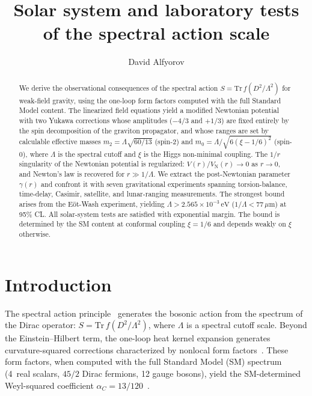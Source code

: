 \documentclass[aps,prd,twocolumn,superscriptaddress,nofootinbib,floatfix]{revtex4-2}
\begin{document}
\title{Solar system and laboratory tests of the spectral action scale}

\author{David Alfyorov}

\begin{abstract}
We derive the observational consequences of the spectral action
$S = \mathrm{Tr}\,f(D^2/\Lambda^2)$ for weak-field gravity, using the
one-loop form factors computed with the full Standard Model content.
The linearized field equations yield a modified Newtonian potential with
two Yukawa corrections whose amplitudes ($-4/3$ and $+1/3$) are
fixed entirely by the spin decomposition of the graviton
propagator, and whose ranges are set by calculable effective masses
$m_2 = \Lambda\sqrt{60/13}$ (spin-2) and
$m_0 = \Lambda/\sqrt{6(\xi-1/6)^2}$ (spin-0), where $\Lambda$ is the
spectral cutoff and $\xi$ is the Higgs non-minimal coupling.
The $1/r$ singularity of the Newtonian potential is regularized:
$V(r)/V_\mathrm{N}(r) \to 0$ as $r \to 0$, and Newton's law is
recovered for $r \gg 1/\Lambda$.
We extract the post-Newtonian parameter $\gamma(r)$ and confront it with
seven gravitational experiments spanning torsion-balance, time-delay,
Casimir, satellite, and lunar-ranging measurements.
The strongest bound arises from the E\"ot-Wash experiment, yielding
$\Lambda > 2.565 \times 10^{-3}\,\mathrm{eV}$ ($1/\Lambda < 77\,\mu\mathrm{m}$)
at 95\% CL.
All solar-system tests are satisfied with exponential margin.
The bound is determined by the SM content at conformal coupling $\xi = 1/6$ and depends
weakly on $\xi$ otherwise.
\end{abstract}


\maketitle


\section{Introduction}
\label{sec:intro}

The spectral action principle~\cite{Chamseddine:1996zu,Chamseddine:2006ep}
generates the bosonic action from the spectrum of the Dirac operator:
$S = \mathrm{Tr}\,f(D^2/\Lambda^2)$, where $\Lambda$ is a spectral
cutoff scale. Beyond the Einstein--Hilbert term, the one-loop heat kernel
expansion generates curvature-squared corrections characterized by
nonlocal form factors~\cite{Barvinsky:1985an,Codello:2012kq}. These
form factors, when computed with the full Standard Model (SM) spectrum
(4~real scalars, $45/2$ Dirac fermions, 12 gauge bosons), yield the
SM-determined Weyl-squared coefficient
$\alpha_C = 13/120$~\cite{Alfyorov:2026ff}.
\end{document}
